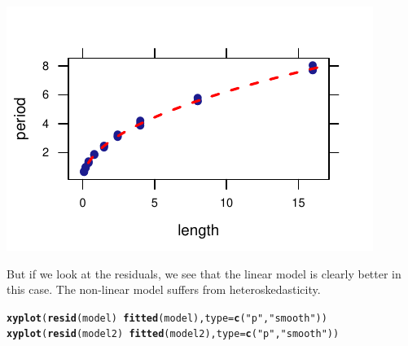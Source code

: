 \documentclass[twoside]{book}\usepackage[]{graphicx}\usepackage[]{xcolor}
\makeatletter
\def\maxwidth{ %
  \ifdim\Gin@nat@width>\linewidth
    \linewidth
  \else
    \Gin@nat@width
  \fi
}
\newcommand{\hlstr}[1]{\textcolor[rgb]{0.192,0.494,0.8}{#1}}%
\newcommand{\hlopt}[1]{\textcolor[rgb]{0,0,0}{#1}}%
\newcommand{\hlstd}[1]{\textcolor[rgb]{0.345,0.345,0.345}{#1}}%
\newcommand{\hlkwc}[1]{\textcolor[rgb]{0.333,0.667,0.333}{#1}}%
\newcommand{\hlkwd}[1]{\textcolor[rgb]{0.737,0.353,0.396}{\textbf{#1}}}%
\newenvironment{kframe}{%
 \def\at@end@of@kframe{}%
 \ifinner\ifhmode%
  \def\at@end@of@kframe{\end{minipage}}%
  \begin{minipage}{\columnwidth}%
 \fi\fi%
 \def\FrameCommand##1{\hskip\@totalleftmargin \hskip-\fboxsep
 \colorbox{shadecolor}{##1}\hskip-\fboxsep
     \hskip-\linewidth \hskip-\@totalleftmargin \hskip\columnwidth}%
 \MakeFramed {\advance\hsize-\width
   \@totalleftmargin\z@ \linewidth\hsize
   \@setminipage}}%
 {\par\unskip\endMakeFramed%
 \at@end@of@kframe}
\newenvironment{knitrout}{}{} %
\makeatother
\begin{document}
\begin{solution}
\begin{knitrout}
{\includegraphics[width=\maxwidth]{figures/fig-unnamed-chunk-211-4} 

}



\end{knitrout}
	But if we look at the residuals, we see that the linear model is clearly 
	better in this case.  The non-linear model suffers from heteroskedasticity.
\begin{knitrout}
\color{fgcolor}\begin{kframe}
\begin{alltt}
\hlkwd{xyplot}\hlstd{(}\hlkwd{resid}\hlstd{(model)} \hlopt{~} \hlkwd{fitted}\hlstd{(model),} \hlkwc{type} \hlstd{=} \hlkwd{c}\hlstd{(}\hlstr{"p"}\hlstd{,} \hlstr{"smooth"}\hlstd{))}
\hlkwd{xyplot}\hlstd{(}\hlkwd{resid}\hlstd{(model2)} \hlopt{~} \hlkwd{fitted}\hlstd{(model2),} \hlkwc{type} \hlstd{=} \hlkwd{c}\hlstd{(}\hlstr{"p"}\hlstd{,} \hlstr{"smooth"}\hlstd{))}
\end{alltt}
\end{kframe}


\end{knitrout}
\end{solution}
\end{document}
